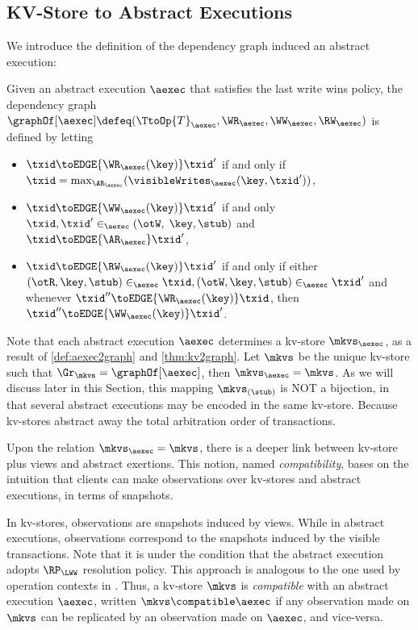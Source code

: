 \subsection{KV-Store to Abstract Executions}
\label{app:aexec2kv}
\label{sec:thm:aexec2kv-compatible-proof}

We introduce the definition of the dependency graph induced an abstract execution:

\begin{definition}
\label{def:aexec2graph}
Given an abstract execution \(\aexec\) that satisfies the last write wins policy,
the dependency graph $\graphOf[\aexec] \defeq (\TtoOp{T}_{\aexec}, \WR_{\aexec}, 
\WW_{\aexec}, \RW_{\aexec})$ is defined by letting
\begin{itemize}
\item \(\txid \toEDGE{\WR_{\aexec}(\key)} \txid'\) if and only if 
\(\txid = \max_{\AR_{\aexec}}(\visibleWrites_{\aexec}(\key, \txid'))\), 
\item \(\txid \toEDGE{\WW_{\aexec}(\key)} \txid'\) if and only 
\(\txid, \txid' \in_{\aexec} (\otW, \;\key, \stub)\) 
and \(\txid \toEDGE{\AR_{\aexec}} \txid'\),
\item \(\txid \toEDGE{\RW_{\aexec}(\key)} \txid'\) if and only if either 
\((\otR, \key, \stub) \in_{\aexec} \txid, (\otW, \key, \stub) \in_{\aexec} \txid'\) and 
whenever \(\txid'' \toEDGE{\WR_{\aexec}(\key)} \txid\), 
then \(\txid'' \toEDGE{\WW_{\aexec}(\key)} \txid'\).
\end{itemize}
\end{definition}

Note that each abstract execution \(\aexec\) determines a kv-store \(\mkvs_{\aexec}\),
as a result of \cref{def:aexec2graph} and \cref{thm:kv2graph}. 
Let \(\mkvs\) be the unique kv-store such that \(\Gr_{\mkvs} = \graphOf[\aexec]\), then \(\mkvs_{\aexec} = \mkvs\). 
As we will discuss later in this Section,
this mapping \(\mkvs_{(\stub)}\) is NOT a bijection, 
in that several abstract executions may be encoded in the same kv-store.
Because kv-stores abstract away the total arbitration order of transactions.

Upon the relation \( \mkvs_{\aexec} = \mkvs \),
there is a deeper link between kv-store plus views and abstract exertions.
This notion, named \emph{compatibility}, bases on the intuition that 
clients can make observations over kv-stores and abstract executions, in terms of snapshots.

In kv-stores, observations are snapshots induced by views. 
While in abstract executions, observations correspond to the snapshots induced by the visible transactions.
Note that it is under the condition that the abstract execution adopts \(\RP_{\LWW}\) resolution policy.
This approach is analogous to the one used by operation contexts in \cite{repldatatypes}.
Thus, a kv-store \(\mkvs\) is \emph{compatible} with an abstract execution \(\aexec\), written \( \mkvs \compatible \aexec \)
if any observation made on \(\mkvs\) can be replicated by an observation made on \(\aexec\), and vice-versa. 

